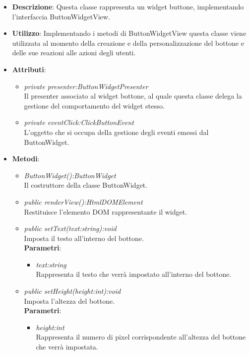 \begin{itemize}
\item \textbf{Descrizione}: Questa classe rappresenta un widget buttone, implementando l'interfaccia ButtonWidgetView.
\item \textbf{Utilizzo}: Implementando i metodi di ButtonWidgetView questa classe viene utilizzata al momento della creazione e della personalizzazione del bottone e delle sue reazioni alle azioni degli utenti.
\item \textbf{Attributi}: 
	\begin{itemize}
	\item \textit{private presenter:ButtonWidgetPresenter}\\
	Il presenter associato al widget bottone, al quale questa classe delega la gestione del comportamento del widget stesso.
	\item \textit{private eventClick:ClickButtonEvent}\\
	L'oggetto che si occupa della gestione degli eventi emessi dal ButtonWidget.
	\end{itemize}
\item \textbf{Metodi}:
	\begin{itemize}
	\item \textit{ButtonWidget():ButtonWidget}\\
	Il costruttore della classe ButtonWidget.
	\item \textit{public renderView():HtmlDOMElement}\\
	 Restituisce l'elemento DOM rappresentante il widget.
	\item \textit{public setText(text:string):void}\\
	Imposta il testo all'interno del bottone.
		\\ \textbf{Parametri}: \begin{itemize}
		\item \textit{text:string}\\
		Rappresenta il testo che verrà impostato all'interno del bottone.
		\end{itemize}
	\item \textit{public setHeight(height:int):void}\\
	Imposta l'altezza del bottone.
		\\ \textbf{Parametri}: \begin{itemize}
		\item \textit{height:int}\\
		Rappresenta il numero di pixel corrispondente all'altezza del bottone che verrà impostata.

\end{itemize}
\end{itemize}
\end{itemize}
